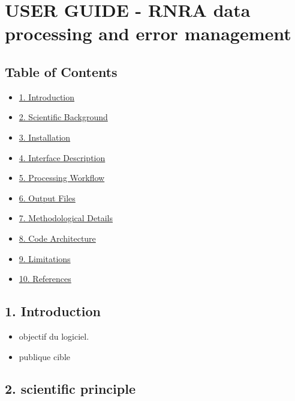 \hypertarget{user-guide---rnra-data-processing-and-error-management}{%
\section{USER GUIDE - RNRA data processing and error
management}\label{user-guide---rnra-data-processing-and-error-management}}

\hypertarget{table-of-contents}{%
\subsection{Table of Contents}\label{table-of-contents}}

\begin{itemize}
\tightlist
\item
  \protect\hyperlink{1-introduction}{1. Introduction}
\item
  \protect\hyperlink{2-scientific-background}{2. Scientific Background}
\item
  \protect\hyperlink{3-installation}{3. Installation}
\item
  \protect\hyperlink{4-interface-description}{4. Interface Description}
\item
  \protect\hyperlink{5-processing-workflow}{5. Processing Workflow}
\item
  \protect\hyperlink{6-output-files}{6. Output Files}
\item
  \protect\hyperlink{7-methodological-details}{7. Methodological
  Details}
\item
  \protect\hyperlink{8-Code-Architecture}{8. Code Architecture}
\item
  \protect\hyperlink{9-limitations}{9. Limitations}
\item
  \protect\hyperlink{10-references}{10. References}
\end{itemize}

\hypertarget{introduction}{%
\subsection{1. Introduction}\label{introduction}}

\begin{itemize}
\tightlist
\item
  objectif du logiciel.
\item
  publique cible
\end{itemize}

\hypertarget{scientific-principle}{%
\subsection{2. scientific principle}\label{scientific-principle}}

